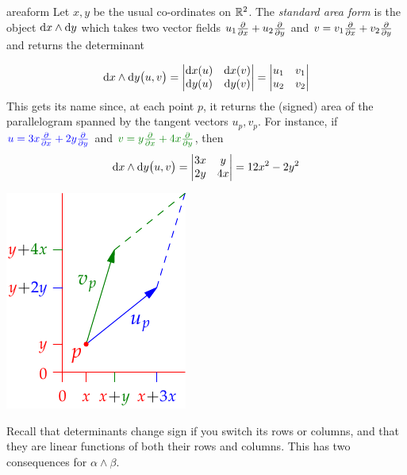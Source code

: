 \begin{example}{}{areaform}
Let $x,y$ be the usual co-ordinates on $\mathbb{R}^2$. The \emph{standard area form} is the object ${\mathrm{d} x}\wedge{\mathrm{d}y}$ which takes two vector fields $u_1\frac{\partial }{\partial x}+u_2\frac{\partial }{\partial y}$ and $v=v_1\frac{\partial }{\partial x}+v_2\frac{\partial }{\partial y}$ and returns the determinant\par
\begin{minipage}[t]{0.73\linewidth}\vspace{-8pt}
\[{\mathrm{d} x}\wedge{\mathrm{d}y}\bigl(u,v\bigr)=\begin{vmatrix}
{\mathrm{d}x}(u)&{\mathrm{d} x}(v)\\
{\mathrm{d} y}(u)&{\mathrm{d} y}(v)
\end{vmatrix}
=\begin{vmatrix}
u_1&v_1\\
u_2&v_2
\end{vmatrix}\]
This gets its name since, at each point $p$, it returns the (signed) area of the parallelogram spanned by the tangent vectors $u_p,v_p$.\smallbreak
For instance, if $\textcolor{blue}{u=3x\frac{\partial }{\partial x}+2y\frac{\partial }{\partial y}}$ and $\textcolor{Green}{v=y\partials x+4x\partials y}$, then
\[{\mathrm{d} x}\wedge{\mathrm{d}y}\bigl(u,v\bigr)=
\begin{vmatrix}
3x&y\\
2y&4x
\end{vmatrix}
=12x^2-2y^2\]
\end{minipage}\hfill\begin{minipage}[t]{0.26\linewidth}\vspace{0pt}
\flushright\includegraphics{forms-para}
\end{minipage}
\end{example}

Recall that determinants change sign if you switch its rows or columns, and that they are linear functions of both their rows and columns. This has two consequences for $\alpha\wedge \beta$.

